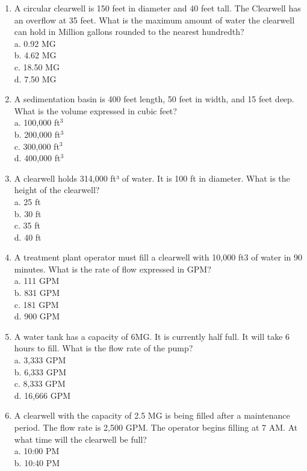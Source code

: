 \begin{enumerate}
\item A circular clearwell is 150 feet in diameter and 40 feet tall. The Clearwell has an overflow at 35 feet. What is the maximum amount of water the clearwell can hold in Million gallons rounded to the nearest hundredth?\\
a. 0.92 MG\\
b. 4.62 MG\\
c. 18.50 MG\\
d. 7.50 MG\\
\item A sedimentation basin is 400 feet length, 50 feet in width, and 15 feet deep. What is the volume expressed in cubic feet?\\
a. 100,000 ft$^3$\\
b. 200,000 ft$^3$\\
c. 300,000 ft$^3$\\
d. 400,000 ft$^3$\\
\item A clearwell holds 314,000 ft³ of water. It is 100 ft in diameter. What is the height of the clearwell?\\
a. 25 ft\\
b. 30 ft\\
c. 35 ft\\
d. 40 ft\\
\item A treatment plant operator must fill a clearwell with 10,000 ft3 of water in 90 minutes. What is the rate of flow expressed in GPM?\\
a. 111 GPM\\
b. 831 GPM\\
c. 181 GPM\\
d. 900 GPM\\
\item A water tank has a capacity of 6MG. It is currently half full. It will take 6 hours to fill. What is the flow rate of the pump?\\
a. 3,333 GPM\\
b. 6,333 GPM\\
c. 8,333 GPM\\
d. 16,666 GPM\\
\item A clearwell with the capacity of 2.5 MG is being filled after a maintenance period. The flow rate is 2,500 GPM. The operator begins filling at 7 AM. At what time will the clearwell be full?\\
a. 10:00 PM\\
b. 10:40 PM\\

\end{enumerate}
